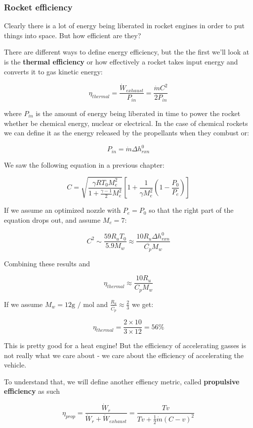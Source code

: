 \documentclass[11pt]{article}
\begin{document}
    \subsubsection{Rocket efficiency}\label{rocket-efficiency}

Clearly there is a lot of energy being liberated in rocket engines in
order to put things into space. But how efficient are they?

There are different ways to define energy efficiency, but the the first
we'll look at is the \textbf{thermal efficiency} or how effectively a
rocket takes input energy and converts it to gas kinetic energy:

\[\eta_{thermal} = \frac{\dot{W}_{exhaust}}{P_{in}} = \frac{\dot{m}C^2}{2P_{in}}\]

where \(P_{in}\) is the amount of energy being liberated in time to
power the rocket whether be chemical energy, nuclear or electrical. In
the case of chemical rockets we can define it as the energy released by
the propellants when they combust or:

\[P_{in} = \dot{m} \Delta h^0_{rxn}\]

We saw the following equation in a previous chapter:

\[C = \sqrt{\frac{\gamma R T_0 M_e^2}{1+\frac{\gamma-1}{2}M_e^2}} \left[1 +\frac{1}{\gamma M_e^2}\left(1-\frac{P_0}{P_e}\right)\right]\]

If we assume an optimized nozzle with \(P_e = P_0\) so that the right
part of the equation drops out, and assume \(M_e = 7\):

\[C^2 \sim \frac{59R_uT_0}{5.9M_w} \approx \frac{10 R_u\Delta h^0_{rxn}}{\overline{C_p}M_w}\]

Combining these results and

\[\eta_{thermal} \approx \frac{10R_u}{C_p M_w}\]

If we assume \(M_w = 12 \text{g / mol}\) and
\(\frac{R_u}{\overline{C_p}} \approx \frac{2}{3}\) we get:

\[\eta_{thermal} = \frac{2 \times 10}{3 \times 12} = 56\%\]

This is pretty good for a heat engine! But the efficiency of
accelerating gasses is not really what we care about - we care about the
efficiency of accelerating the vehicle.

    To understand that, we will define another effiency metric, called
\textbf{propulsive efficiency} as such

\[\eta_{prop} = \frac{\dot{W}_{r}}{\dot{W}_{r} + \dot{W}_{exhaust}} = \frac{Tv}{Tv + \frac{1}{2}\dot{m}(C - v)^2}\]
\end{document}
